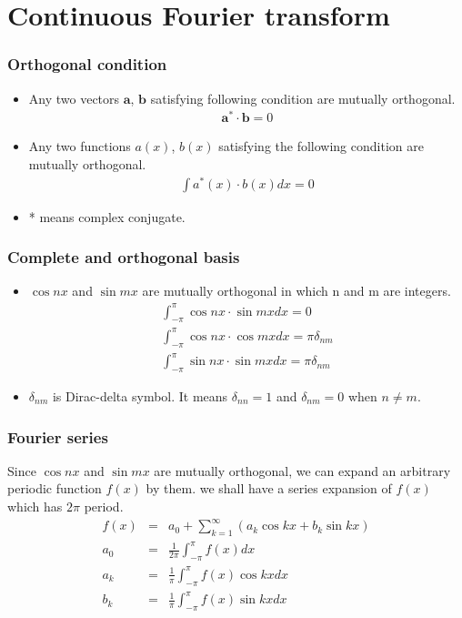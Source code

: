 \documentclass{beamer}
\begin{document}
\section{Continuous Fourier transform}
\begin{frame}
\frametitle{Orthogonal condition}
\begin{itemize}
\item Any two vectors $\mathbf{a}$, $\mathbf{b}$ satisfying following condition are mutually orthogonal. \newline
\begin{eqnarray}
\mathbf{a}^* \cdot \mathbf{b} = 0
\label{eq:ortho_vec}
\end{eqnarray}
\item Any two functions $a(x)$, $b(x)$ satisfying the following condition are mutually orthogonal. \newline
\begin{eqnarray}
\int{a^*(x)} \cdot {b(x)} dx = 0
\label{eq:ortho_func}
\end{eqnarray}
\item * means complex conjugate. \newline
\end{itemize}
\end{frame}
\begin{frame}
\frametitle{Complete and orthogonal basis}
\begin{itemize}
\item $\cos nx $ and $\sin mx$ are mutually orthogonal in which n and m are integers.
\begin{eqnarray}
\int_{-\pi}^{\pi}{\cos nx} \cdot {\sin mx} dx = 0 \nonumber \\
\int_{-\pi}^{\pi}{\cos nx} \cdot {\cos mx} dx = \pi\delta_{nm} \nonumber \\
\int_{-\pi}^{\pi}{\sin nx} \cdot {\sin mx} dx = \pi\delta_{nm}
\end{eqnarray}
\item $\delta_{nm} $ is Dirac-delta symbol. It means $\delta_{nn} = 1$ and $\delta_{nm} = 0$ when $n \neq m$.
\end{itemize}
\end{frame}
\begin{frame}
\frametitle{Fourier series}
Since $\cos nx $ and $\sin mx$ are mutually orthogonal, we can expand an arbitrary periodic function $f(x)$ by them. we shall have a series expansion of $f(x)$ which has $2\pi$ period.
\begin{eqnarray}
f(x)&=&a_0 + \sum_{k=1}^{\infty} \left(a_k\cos kx + b_k \sin kx\right) \nonumber \\
a_0&=&\frac{1}{2\pi}\int_{-\pi}^{\pi}f(x) dx \nonumber \\
a_k&=&\frac{1}{\pi}\int_{-\pi}^{\pi}f(x) \cos kx dx \nonumber \\
b_k&=&\frac{1}{\pi}\int_{-\pi}^{\pi}f(x) \sin kx dx
\label{eq:fseries}
\end{eqnarray}
\end{frame}
\end{document}

